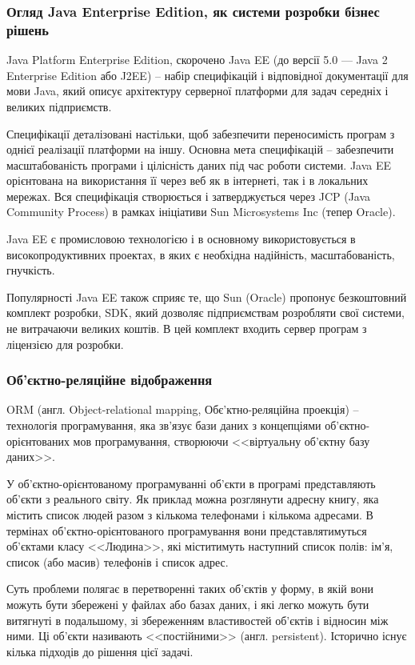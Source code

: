 \subsubsection{Огляд Java Enterprise Edition, як системи розробки бізнес рішень}
\par Java Platform Enterprise Edition, скорочено Java EE (до версії 5.0 — Java 2 Enterprise Edition або J2EE) -- набір специфікацій і відповідної документації для мови Java, який описує архітектуру серверної платформи для задач середніх і великих підприємств.
\par Специфікації деталізовані настільки, щоб забезпечити переносимість програм з однієї реалізації платформи на іншу. Основна мета специфікацій -- забезпечити масштабованість програми і цілісність даних під час роботи системи. Java EE орієнтована на використання її через веб як в інтернеті, так і в локальних мережах. Вся специфікація створюється і затверджується через JCP (Java Community Process) в рамках ініціативи Sun Microsystems Inc (тепер Oracle).
\par Java EE є промисловою технологією і в основному використовується в високопродуктивних проектах, в яких є необхідна надійність, масштабованість, гнучкість.
\par Популярності Java EE також сприяє те, що Sun (Oracle) пропонує безкоштовний комплект розробки, SDK, який дозволяє підприємствам розробляти свої системи, не витрачаючи великих коштів. В цей комплект входить сервер програм з ліцензією для розробки.

\subsubsection{Об'єктно-реляційне відображення}
\par ORM (англ. Object-relational mapping, Обє'ктно-реляційна проекція) -- технологія програмування, яка зв'язує бази даних з концепціями об'єктно-орієнтованих мов програмування, створюючи <<віртуальну об'єктну базу даних>>.
\par У об'єктно-орієнтованому програмуванні об'єкти в програмі представляють об'єкти з реального світу. Як приклад можна розглянути адресну книгу, яка містить список людей разом з кількома телефонами і кількома адресами. В термінах об'єктно-орієнтованого програмування вони представлятимуться об'єктами класу <<Людина>>, які міститимуть наступний список полів: ім'я, список (або масив) телефонів і список адрес.
\par Суть проблеми полягає в перетворенні таких об'єктів у форму, в якій вони можуть бути збережені у файлах або базах даних, і які легко можуть бути витягнуті в подальшому, зі збереженням властивостей об'єктів і відносин між ними. Ці об'єкти називають <<постійними>> (англ. persistent). Історично існує кілька підходів до рішення цієї задачі.

